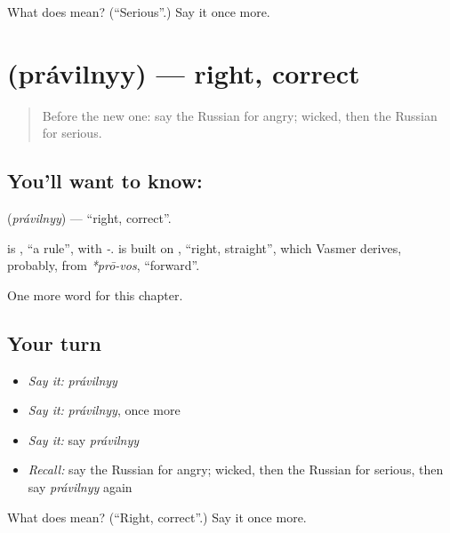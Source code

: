 \begin{tcolorbox}[breakable,colback=teal!4,colframe=teal!35!black,title={Before you move on}]
What does  mean? (\textquotedblleft{}Serious\textquotedblright{}.) Say it once more.
\end{tcolorbox}
\section[\texorpdfstring{\ru{правильный} (právilnyy)}{правильный (právilnyy)}]{ (právilnyy) — right, correct}

\label{lesson:RU-C127-right}



\begin{quote}
Before the new one: say the Russian for angry; wicked, then the Russian for serious.
\end{quote}

\subsection*{You'll want to know: }
\textbf{} (\emph{právilnyy}) — \textquotedblleft{}right, correct\textquotedblright{}.

\begin{cousinweb}
\textbf{} is \emph{}, \textquotedblleft{}a rule\textquotedblright{}, with \emph{-}. \emph{} is built on \emph{}, \textquotedblleft{}right, straight\textquotedblright{}, which Vasmer derives, probably, from \emph{*prō-vos}, \textquotedblleft{}forward\textquotedblright{}.
\end{cousinweb}

\begin{grammarlens}[title={What you've built}]
One more word for this chapter.
\end{grammarlens}

\subsection*{Your turn}
\begin{itemize}
\raggedright
  \item \emph{Say it:} \emph{právilnyy}
  \item \emph{Say it:} \emph{právilnyy}, once more
  \item \emph{Say it:} say \emph{právilnyy}
  \item \emph{Recall:} say the Russian for angry; wicked, then the Russian for serious, then say \emph{právilnyy} again
\end{itemize}

\begin{tcolorbox}[breakable,colback=teal!4,colframe=teal!35!black,title={Before you move on}]
What does  mean? (\textquotedblleft{}Right, correct\textquotedblright{}.) Say it once more.
\end{tcolorbox}
